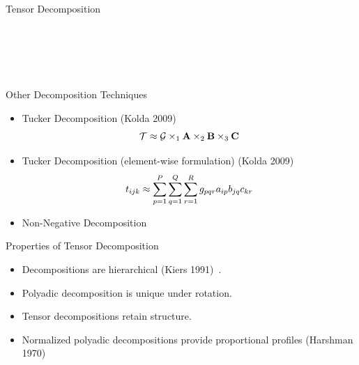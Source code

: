 \documentclass[handout]{beamer}
\begin{document}
\begin{frame}{Tensor Decomposition}
\begin{columns}
\begin{figure}
{  }\\
\end{figure}
\end{columns}
\end{frame}

\begin{frame}{Other Decomposition Techniques}
  \begin{itemize}
  \item Tucker Decomposition (Kolda 2009)~\cite{kolda2009}
    \[
      \mathcal{T} \approx \mathcal{G} \times_1 \mathrm{\bf A} \times_2 \mathrm{\bf B} \times_3
  \mathrm{\bf C}
\]
  \item Tucker Decomposition (element-wise formulation) (Kolda
    2009)~\cite{kolda2009}
    \[
        t_{ijk} \approx \displaystyle\sum_{p=1}^P \displaystyle\sum_{q=1}^Q \displaystyle\sum_{r=1}^R
  g_{pqr}a_{ip}b_{jq}c_{kr}
\]
\item Non-Negative Decomposition
  \end{itemize}
\end{frame}

\begin{frame}{Properties of Tensor Decomposition}
  \begin{itemize}[<+->]
  \item Decompositions are hierarchical (Kiers 1991)~\cite{kiers1991}.
  \item Polyadic decomposition is unique under rotation.
  \item Tensor decompositions retain structure.
  \item Normalized polyadic decompositions provide proportional
    profiles (Harshman 1970)~\cite{harshman1970}
  \end{itemize}
\end{frame}
\end{document}
